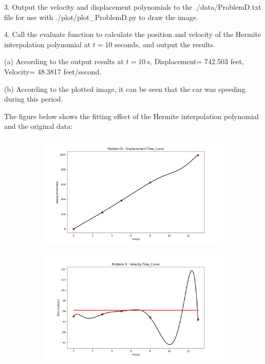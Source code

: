 \documentclass[a4paper]{article}
\begin{document}
3. Output the velocity and displacement polynomials to the ./data/ProblemD.txt file for use with ./plot/plot\_ProblemD.py to draw the image.

4. Call the evaluate function to calculate the position and velocity of the Hermite interpolation polynomial at \( t = 10 \) seconds, and output the results.

(a) According to the output results at \( t = 10 \, s \), Displacement= 742.503 feet, Velocity= 48.3817 feet/second.

(b) According to the plotted image, it can be seen that the car was speeding during this period.

The figure below shows the fitting effect of the Hermite interpolation polynomial and the original data:
\begin{figure}[h]
    \centering
    \begin{subfigure}[b]{0.45\textwidth}
        \includegraphics[width=\textwidth]{Pictures/ProblemD_figure_Displacement-Time_Curve.png}
    \end{subfigure}
    \hfill
    \begin{subfigure}[b]{0.45\textwidth}
        \includegraphics[width=\textwidth]{Pictures/ProblemD_figure_Velocity-Time_Curve.png}
    \end{subfigure}

\end{figure}
\end{document}
